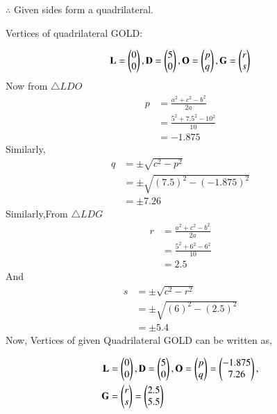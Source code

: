 \documentclass[journal,12pt,twocolumn]{IEEEtran}
\begin{document}
\begin{enumerate}
$\therefore$ Given sides form a quadrilateral.

Vertices of quadrilateral GOLD:

\begin{align}
\textbf{L}=\begin{pmatrix}0 \\ 0\end{pmatrix},
\textbf{D}=\begin{pmatrix}5 \\ 0\end{pmatrix} ,
\textbf{O}=\begin{pmatrix}p \\ q\end{pmatrix},
\textbf{G}=\begin{pmatrix}r \\ s\end{pmatrix}
\end{align}
Now from $\triangle LDO$
\begin{align}
p&= \frac{a^2+c^2-b^2}{2a}
\\
&=\frac{5^2+7.5^2-10^2}{10}
\\
&=-1.875
\end{align}
Similarly,
\begin{align}
q&= \pm \sqrt{c^2-p^2}
\\
&= \pm \sqrt{(7.5)^2-(-1.875)^2}
\\
&= \pm7.26
\end{align}
Similarly,From $\triangle LDG$
\begin{align}
r&= \frac{a^2+c^2-b^2}{2a}
\\
&=\frac{5^2+6^2-6^2}{10}
\\
&=2.5
\end{align}
And
\begin{align}
s&= \pm \sqrt{c^2-r^2}
\\
&= \pm \sqrt{(6)^2-(2.5)^2}
\\
&= \pm 5.4
\end{align} 
Now, Vertices of given Quadrilateral GOLD can be written as,

\begin{align}
\mathbf{L} &= \begin{pmatrix}0\\0\end{pmatrix},\mathbf{D} = \begin{pmatrix}5\\0\end{pmatrix}, \mathbf{O}=\begin{pmatrix}p\\q\end{pmatrix}=\begin{pmatrix}-1.875\\7.26\end{pmatrix},\nonumber \\
\mathbf{G} &= \begin{pmatrix}r\\s\end{pmatrix}=\begin{pmatrix}2.5\\5.5\end{pmatrix}
\end{align}


\end{enumerate}
\end{document}
